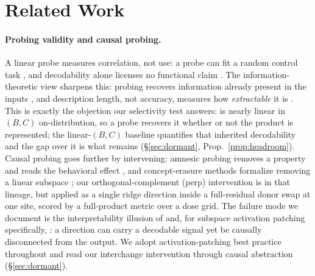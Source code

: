 \section{Related Work}
\label{sec:related}

\paragraph{Probing validity and causal probing.}
A linear probe measures correlation, not use: a probe can fit a random control task
\citep{hewitt-liang-2019-designing}, and decodability alone licenses no functional claim
\citep{belinkov-2022-probing}. The information-theoretic view sharpens this: probing recovers
information already present in the inputs \citep{pimentel-etal-2020-information}, and description
length, not accuracy, measures how \emph{extractable} it is \citep{voita-titov-2020-information}.
This is exactly the objection our selectivity test answers: \bc{} is nearly linear in $(B,C)$
on-distribution, so a probe recovers it whether or not the product is represented; the
linear-$(B,C)$ baseline quantifies that inherited decodability and the gap over it is what remains
(\S\ref{sec:dormant}, Prop.~\ref{prop:headroom}). Causal probing goes further by intervening:
amnesic probing removes a property and reads the behavioral effect
\citep{elazar-etal-2021-amnesic}, and concept-erasure methods formalize removing a linear subspace
\citep{ravfogel-etal-2020-null, belrose-etal-2023-leace}; our orthogonal-complement (perp)
intervention is in that lineage, but applied as a single ridge direction inside a full-residual
donor swap at one site, scored by a full-product metric over a dose grid. The failure mode we
document is the interpretability illusion of \citet{bolukbasi-etal-2021-illusion} and, for subspace
activation patching specifically, \citet{makelov-etal-2024-subspace}: a direction can carry a
decodable signal yet be causally disconnected from the output. We adopt activation-patching best
practice throughout \citep{zhang-nanda-2024-towards, heimersheim-nanda-2024-use} and read our
interchange intervention through causal abstraction \citep{geiger-etal-2021-causal}
(\S\ref{sec:dormant}).

